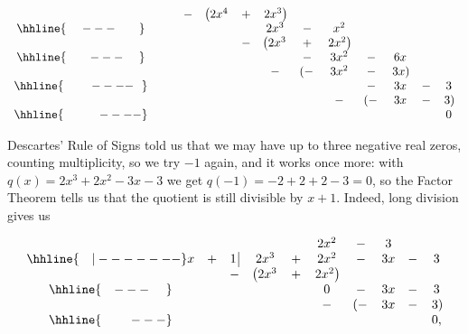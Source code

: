 {\begin{enumerate}
{\[\begin{array}{ccccccccccccc}
  &  &  &  -& \left(2x^4 \right.& + & \left.2x^3\right) &  &  &  &  &    \\ \hhline{~~~~---~~~~~~} 
  &  &  &   &    &   &  2x^3    & - & x^2 &  &  &  &  \\ 
  &  &  &   &    & - &  \left(2x^3\right. & +  & \left. 2x^2\right) & &  &  &     \\ 
\hhline{~~~~~~---~~~~} 
  &  &  &   &    &   &                    &  - & 3x^2 & - & 6x & & \\
  &  &  &   &    &   &                  - &\left(-\right. & 3x^2 & - & \left.3x\right) & & \\
 \hhline{~~~~~~~----~~}   
  &  &  &   &    &   &  &  &  & - & 3x & - &3 \\
  &  &  &   &    &   &  &  & - &\left(-\right. & 3x & - & \left.3\right)\\
 \hhline{~~~~~~~~~----}
  &  &  &   &    &   &  &  &   &               &    &   & 0 

 \end{array}\]
 
\setlength\arraycolsep{5pt}
\setlength\extrarowheight{0pt}

Descartes' Rule of Signs told us that we may have up to three negative real zeros, counting multiplicity, so we try $-1$ again, and it works once more: with $q(x) = 2x^3+2x^2-3x-3$ we get $q(-1) = -2+2+2-3=0$, so the Factor Theorem tells us that the quotient is still divisible by $x+1$. Indeed, long division gives us 

\setlength\arraycolsep{0.1pt}
\setlength\extrarowheight{2pt}

\[ \begin{array}{cccccccccc}

& & & & & 2x^2 & - & 3 &  &  \\ \hhline{~~~|-------}

x & + & 1 \, \vline& 2x^3 & + & 2x^2 & - & 3x & - & 3\\

 &  &  -& \left(2x^3 \right. & + & \left.  2x^2\right) &  &  &  &  \\ \hhline{~~~---~~~~} 
 &  &  &   &   & 0 & - & 3x  & - & 3 \\ 
 &  &  &   &   & - & \left(-\right. & 3x & - & \left.3\right) \\  \hhline{~~~~~~~---} 
 &   &  &  &  &  &  &  &  & 0,
 
\end{array}\]

\setlength\arraycolsep{5pt}
\setlength\extrarowheight{0pt}

}
\end{enumerate}}
